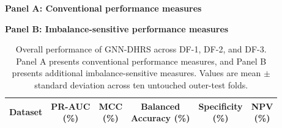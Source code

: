 \documentclass[pdflatex,sn-mathphys-num]{sn-jnl}%
\theoremstyle{thmstyleone}%
\theoremstyle{thmstyletwo}%
\theoremstyle{thmstylethree}%
\begin{document}
\begin{table}[!ht]
\centering
\caption{
Overall performance of GNN-DHRS across DF-1, DF-2, and DF-3.
 {
Panel A presents conventional performance measures, and Panel B presents
additional imbalance-sensitive measures. Values are mean \(\pm\) standard
deviation across ten untouched outer-test folds.
}}
\label{tab:gnndhrs_overall_results}
\small
\renewcommand{\arraystretch}{1.12}

\textbf{Panel A: Conventional performance measures}

\vspace{3pt}
\setlength{\tabcolsep}{5pt}


\vspace{7pt}

\begingroup
 

\textbf{Panel B: Imbalance-sensitive performance measures}

\vspace{3pt}
\setlength{\tabcolsep}{7pt}

\begin{tabular}{@{}lccccc@{}}
\toprule
\textbf{Dataset} &
\shortstack{\textbf{PR-AUC}\\\textbf{(\%)}} &
\shortstack{\textbf{MCC}\\\textbf{(\%)}} &
\shortstack{\textbf{Balanced}\\\textbf{Accuracy (\%)}} &
\shortstack{\textbf{Specificity}\\\textbf{(\%)}} &
\shortstack{\textbf{NPV}\\\textbf{(\%)}} \\
\midrule


\end{tabular}
\end{table}
\end{document}
